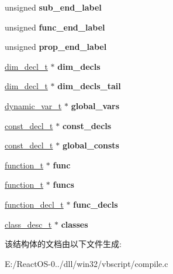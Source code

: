 \begin{DoxyCompactItemize}
unsigned {\bfseries sub\+\_\+end\+\_\+label}
\item 
\mbox{\label{structcompile__ctx__t_acad212f56b1fe0e808971c6963e25650}} 
unsigned {\bfseries func\+\_\+end\+\_\+label}
\item 
\mbox{\label{structcompile__ctx__t_a31a5348d3091e0b82699b9d4e877b449}} 
unsigned {\bfseries prop\+\_\+end\+\_\+label}
\item 
\mbox{\label{structcompile__ctx__t_a1ca3ddb1674a1c487a2f7b88e3457ffd}} 
\hyperlink{struct__dim__decl__t}{dim\+\_\+decl\+\_\+t} $\ast$ {\bfseries dim\+\_\+decls}
\item 
\mbox{\label{structcompile__ctx__t_a938e4ad37cc020e5e2f86aa0f976ff1d}} 
\hyperlink{struct__dim__decl__t}{dim\+\_\+decl\+\_\+t} $\ast$ {\bfseries dim\+\_\+decls\+\_\+tail}
\item 
\mbox{\label{structcompile__ctx__t_ac3417769848426b599df1f0bbda3c88f}} 
\hyperlink{struct__dynamic__var__t}{dynamic\+\_\+var\+\_\+t} $\ast$ {\bfseries global\+\_\+vars}
\item 
\mbox{\label{structcompile__ctx__t_a7288f8be890891101b10fd8894d361ce}} 
\hyperlink{struct__const__decl__t}{const\+\_\+decl\+\_\+t} $\ast$ {\bfseries const\+\_\+decls}
\item 
\mbox{\label{structcompile__ctx__t_a7eb949aac7f6bc01a017a13c0e2ab327}} 
\hyperlink{struct__const__decl__t}{const\+\_\+decl\+\_\+t} $\ast$ {\bfseries global\+\_\+consts}
\item 
\mbox{\label{structcompile__ctx__t_a266f75b4c612b213640f6bd894115833}} 
\hyperlink{struct__function__t}{function\+\_\+t} $\ast$ {\bfseries func}
\item 
\mbox{\label{structcompile__ctx__t_a70e4b95ea21c85a092d8d2b4e69fc937}} 
\hyperlink{struct__function__t}{function\+\_\+t} $\ast$ {\bfseries funcs}
\item 
\mbox{\label{structcompile__ctx__t_a2b6cd81f0a37e0c45f6fb3e5b8b24d6f}} 
\hyperlink{struct__function__decl__t}{function\+\_\+decl\+\_\+t} $\ast$ {\bfseries func\+\_\+decls}
\item 
\mbox{\label{structcompile__ctx__t_afd7cb1115e79b2920d0d674863a046bd}} 
\hyperlink{struct__class__desc__t}{class\+\_\+desc\+\_\+t} $\ast$ {\bfseries classes}
\end{DoxyCompactItemize}


该结构体的文档由以下文件生成\+:\begin{DoxyCompactItemize}
\item 
E\+:/\+React\+O\+S-\/0../dll/win32/vbscript/compile.\+c\end{DoxyCompactItemize}
